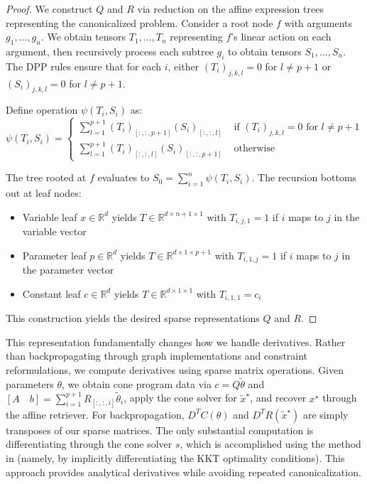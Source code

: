 \documentclass{article}
\begin{document}
\begin{proof}
We construct $Q$ and $R$ via reduction on the affine expression trees representing the canonicalized problem. Consider a root node $f$ with arguments $g_1,\ldots,g_n$. We obtain tensors $T_1,\ldots,T_n$ representing $f$'s linear action on each argument, then recursively process each subtree $g_i$ to obtain tensors $S_1,\ldots,S_n$. The DPP rules ensure that for each $i$, either $(T_i)_{j,k,l}=0$ for $l\neq p+1$ or $(S_i)_{j,k,l}=0$ for $l\neq p+1$.

Define operation $\psi(T_i,S_i)$ as:
\[
\psi(T_i,S_i) = \begin{cases}
   \sum_{l=1}^{p+1} (T_i)_{[:,:,p+1]}(S_i)_{[:,:,l]} & \text{ if } (T_i)_{j,k,l}=0 \text{ for } l\neq p+1 \\
   \sum_{l=1}^{p+1} (T_i)_{[:,:,l]}(S_i)_{[:,:,p+1]} & \text{ otherwise}
\end{cases}
\]

The tree rooted at $f$ evaluates to $S_0 = \sum_{i=1}^n \psi(T_i,S_i)$. The recursion bottoms out at leaf nodes:
\begin{itemize}
    \item Variable leaf $x \in \mathbb{R}^d$ yields $T \in \mathbb{R}^{d\times n+1 \times 1}$ with $T_{i,j,1} = 1$ if $i$ maps to $j$ in the variable vector
    \item Parameter leaf $p \in \mathbb{R}^d$ yields $T \in \mathbb{R}^{d\times 1 \times p+1}$ with $T_{i,1,j} = 1$ if $i$ maps to $j$ in the parameter vector  
    \item Constant leaf $c \in \mathbb{R}^d$ yields $T \in \mathbb{R}^{d\times 1 \times 1}$ with $T_{i,1,1} = c_i$
\end{itemize}
This construction yields the desired sparse representations $Q$ and $R$.
\end{proof}

This representation fundamentally changes how we handle derivatives. Rather than backpropagating through graph implementations and constraint reformulations, we compute derivatives using sparse matrix operations. Given parameters $\theta$, we obtain cone program data via $c = Q\tilde{\theta}$ and $[A \quad b] = \sum_{i=1}^{p+1} R_{[:,:,i]}\tilde{\theta}_i$, apply the cone solver for $\tilde{x}^\star$, and recover $x^\star$ through the affine retriever. For backpropagation, $D^T C(\theta)$ and $D^T R(\tilde{x}^\star)$ are simply transposes of our sparse matrices. The only substantial computation is differentiating through the cone solver $s$, which is accomplished using the method in \citet{conedifferentiation} (namely, by implicitly differentiating the KKT optimality conditions). This approach provides analytical derivatives while avoiding repeated canonicalization.
\end{document}
